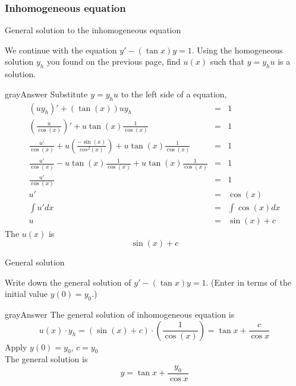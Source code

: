 \subsubsection{Inhomogeneous equation}
\begin{problem}
  General solution to the inhomogeneous equation
\end{problem}
We continue with the equation $y′− (\tan⁡ x)y = 1$.
Using the homogeneous solution $y_h$ you found on the previous page,
find $u(x)$ such that $y = y_h u$ is a solution.

\begin{mybox}{gray}{Answer}
  Substitute $y = y_h u$ to the left side of a equation,
  \begin{eqnarray*}
    (u y_h)' + (\tan(x)) uy_h &=& 1 \\
    \left( \frac{u}{\cos(x)} \right)' + u \tan(x) \frac{1}{\cos(x)} &=& 1 \\
    \frac{u'}{\cos(x)} + u\left( \frac{-\sin(x)}{cos^2 (x)} \right) + u \tan(x) \frac{1}{\cos(x)} &=& 1 \\
    \frac{u'}{\cos(x)} - u \tan(x) \frac{1}{\cos(x)} + u \tan(x) \frac{1}{\cos(x)} &=& 1 \\
    \frac{u'}{\cos(x)} &=& 1 \\
    u' &=& \cos(x) \\
    \int u' dx &=& \int \cos(x) dx \\
    u &=& \sin(x) + c
  \end{eqnarray*}
  The $u(x)$ is
  \begin{equation*}
    \sin (x) + c 
  \end{equation*}
\end{mybox}

\begin{problem}
  General solution
\end{problem}
Write down the general solution of $y′− (\tan⁡ x)y = 1$.
(Enter in terms of the initial value $y(0) = y_0$.)

\begin{mybox}{gray}{Answer}
  The general solution of inhomogeneous equation is
  \begin{equation*}
    u(x) \cdot y_h = \left( \sin (x) + c \right) \cdot (\frac{1}{\cos(x)}) = \tan x + \frac{c}{\cos x}
  \end{equation*}
  Apply $y(0) = y_0$, $c = y_0$ \\

  The general solution is
  \begin{equation*}
    y = \tan x + \frac{y_0}{\cos x}
  \end{equation*}
\end{mybox}
\clearpage
